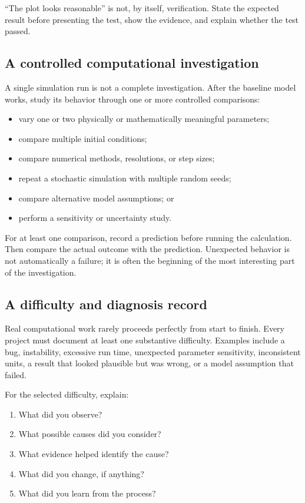\documentclass[11pt]{article}
\begin{document}
``The plot looks reasonable'' is not, by itself, verification. State the expected
result before presenting the test, show the evidence, and explain whether the
test passed.

\subsection{A controlled computational investigation}

A single simulation run is not a complete investigation. After the baseline
model works, study its behavior through one or more controlled comparisons:

\begin{itemize}
  \item vary one or two physically or mathematically meaningful parameters;
  \item compare multiple initial conditions;
  \item compare numerical methods, resolutions, or step sizes;
  \item repeat a stochastic simulation with multiple random seeds;
  \item compare alternative model assumptions; or
  \item perform a sensitivity or uncertainty study.
\end{itemize}

For at least one comparison, record a prediction before running the calculation.
Then compare the actual outcome with the prediction. Unexpected behavior is not
automatically a failure; it is often the beginning of the most interesting part
of the investigation.

\subsection{A difficulty and diagnosis record}

Real computational work rarely proceeds perfectly from start to finish. Every
project must document at least one substantive difficulty. Examples include a
bug, instability, excessive run time, unexpected parameter sensitivity,
inconsistent units, a result that looked plausible but was wrong, or a model
assumption that failed.

For the selected difficulty, explain:

\begin{enumerate}
  \item What did you observe?
  \item What possible causes did you consider?
  \item What evidence helped identify the cause?
  \item What did you change, if anything?
  \item What did you learn from the process?
\end{enumerate}
\end{document}
